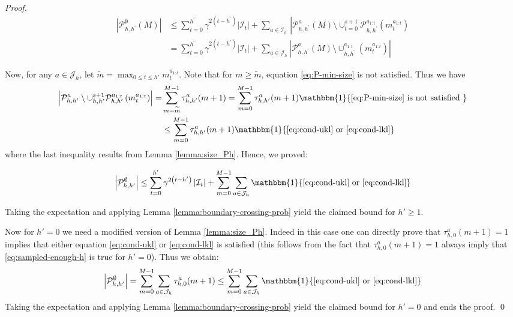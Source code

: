 \documentclass[runningheads]{llncs}
\begin{document}
\begin{proof}
\begin{equation*}
\begin{aligned}\left|\mathcal{P}_{h, h^{\prime}}^{\emptyset}(M)\right| & \leq \sum_{t=0}^{h^{\prime}} \gamma^{2\left(t-h^{\prime}\right)}\left|\mathcal{I}_{t}\right|+\sum_{a \in \mathcal{I}_{h^{\prime}}}\left|\mathcal{P}_{h, h^{\prime}}^{a}(M) \setminus \cup_{t=0}^{s+1} \mathcal{P}_{h, h^{\prime}}^{a_{1 : t}}\left(m_{t}^{a_{1 : t}}\right)\right.\\ &=\sum_{t=0}^{h^{\prime}} \gamma^{2\left(t-h^{\prime}\right)}\left|\mathcal{I}_{t}\right|+\sum_{a \in \mathcal{J}_{h}}\left|\mathcal{P}_{h, h^{\prime}}^{a}(M) \setminus \cup_{h, h^{\prime}}^{a_{1 : t}}\left(m_{t}^{a_{1 : t}}\right)\right| \end{aligned}
\end{equation*}

Now, for any $a\in \mathcal{J}_h$, let $\tilde{m} = \max_{0\leq t\leq h'} m_t^{a_{1:t}}$. Note that for $m\geq \tilde{m}$, equation \eqref{eq:P-min-size} is not satisfied. Thus we have
\begin{equation*}
\begin{aligned}
\left|\mathcal{P}_{h, h^{\prime}}^{a} \setminus \cup_{h, h^{\prime}}^{s+1} \mathcal{P}_{h, h^{\prime}}^{a_{1 : t}}\left(m_{t}^{a_{1 : t}}\right)\right|=&\sum_{m=\tilde{m}}^{M-1} \tau_{h, h^{\prime}}^{a}(m+1)=\sum_{m=0}^{M-1} \tau_{h, h^{\prime}}^{a}(m+1) \mathbbm{1}\{\eqref{eq:P-min-size} \text { is not satisfied }\} \\ & \leq \sum_{m=0}^{M-1} \tau_{h, h^{\prime}}^{a}(m+1) \mathbbm{1}\{\eqref{eq:cond-ukl} \text { or }\eqref{eq:cond-lkl}\} \end{aligned}
\end{equation*}
where the last inequality results from Lemma \ref{lemma:size_Ph}. Hence, we proved:

\begin{equation*}
\left|\mathcal{P}_{h, h^{\prime}}^{\emptyset}\right| \leq \sum_{t=0}^{h^{\prime}} \gamma^{2\left(t-h^{\prime}\right)}\left|\mathcal{I}_{t}\right|+\sum_{m=0}^{M-1} \sum_{a \in \mathcal{J}_{h}} \mathbbm{1}\{\eqref{eq:cond-ukl}\text{ or }\eqref{eq:cond-lkl}\}
\end{equation*}

Taking the expectation and applying Lemma \ref{lemma:boundary-crossing-prob} yield the claimed bound for $h'\geq 1$.

Now for $h' = 0$ we need a modified version of Lemma \ref{lemma:size_Ph}. Indeed in this case one can directly prove that $\tau_{h,0}^a(m+1)=1$ implies that either equation \eqref{eq:cond-ukl} or \eqref{eq:cond-lkl} is satisfied (this follows from the fact that $\tau_{h,0}^a(m+1)=1$ always imply that \eqref{eq:sampled-enough-h} is true for $h'= 0$). Thus we obtain:
\begin{equation*}
\left|\mathcal{P}_{h, h^{\prime}}^{\emptyset}\right|=\sum_{m=0}^{M-1} \sum_{a \in \mathcal{J}_{h}} \tau_{h, 0}^{a}(m+1) \leq \sum_{m=0}^{M-1} \sum_{a \in \mathcal{J}_{h}} \mathbbm{1}\{\eqref{eq:cond-ukl}\text{ or }\eqref{eq:cond-lkl}\}
\end{equation*}
Taking the expectation and applying Lemma \ref{lemma:boundary-crossing-prob} yield the claimed bound for $h' = 0$ and ends the proof.
\qed
\end{proof}
\end{document}
